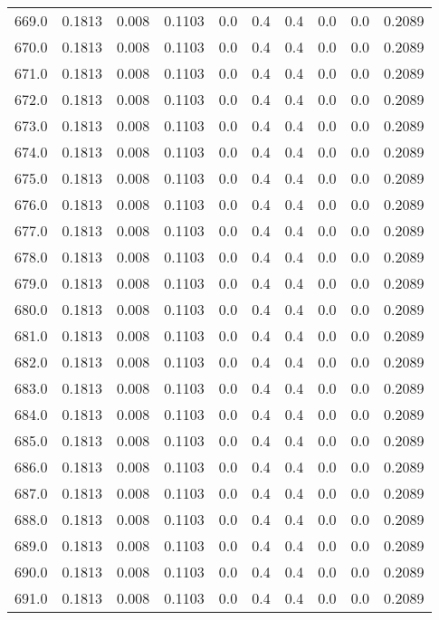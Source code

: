 \begin{longtable}{lrrrrrrrrr}
669.0 & 0.1813 & 0.008 & 0.1103 & 0.0 & 0.4 & 0.4 & 0.0 & 0.0 & 0.2089 \\
670.0 & 0.1813 & 0.008 & 0.1103 & 0.0 & 0.4 & 0.4 & 0.0 & 0.0 & 0.2089 \\
671.0 & 0.1813 & 0.008 & 0.1103 & 0.0 & 0.4 & 0.4 & 0.0 & 0.0 & 0.2089 \\
672.0 & 0.1813 & 0.008 & 0.1103 & 0.0 & 0.4 & 0.4 & 0.0 & 0.0 & 0.2089 \\
673.0 & 0.1813 & 0.008 & 0.1103 & 0.0 & 0.4 & 0.4 & 0.0 & 0.0 & 0.2089 \\
674.0 & 0.1813 & 0.008 & 0.1103 & 0.0 & 0.4 & 0.4 & 0.0 & 0.0 & 0.2089 \\
675.0 & 0.1813 & 0.008 & 0.1103 & 0.0 & 0.4 & 0.4 & 0.0 & 0.0 & 0.2089 \\
676.0 & 0.1813 & 0.008 & 0.1103 & 0.0 & 0.4 & 0.4 & 0.0 & 0.0 & 0.2089 \\
677.0 & 0.1813 & 0.008 & 0.1103 & 0.0 & 0.4 & 0.4 & 0.0 & 0.0 & 0.2089 \\
678.0 & 0.1813 & 0.008 & 0.1103 & 0.0 & 0.4 & 0.4 & 0.0 & 0.0 & 0.2089 \\
679.0 & 0.1813 & 0.008 & 0.1103 & 0.0 & 0.4 & 0.4 & 0.0 & 0.0 & 0.2089 \\
680.0 & 0.1813 & 0.008 & 0.1103 & 0.0 & 0.4 & 0.4 & 0.0 & 0.0 & 0.2089 \\
681.0 & 0.1813 & 0.008 & 0.1103 & 0.0 & 0.4 & 0.4 & 0.0 & 0.0 & 0.2089 \\
682.0 & 0.1813 & 0.008 & 0.1103 & 0.0 & 0.4 & 0.4 & 0.0 & 0.0 & 0.2089 \\
683.0 & 0.1813 & 0.008 & 0.1103 & 0.0 & 0.4 & 0.4 & 0.0 & 0.0 & 0.2089 \\
684.0 & 0.1813 & 0.008 & 0.1103 & 0.0 & 0.4 & 0.4 & 0.0 & 0.0 & 0.2089 \\
685.0 & 0.1813 & 0.008 & 0.1103 & 0.0 & 0.4 & 0.4 & 0.0 & 0.0 & 0.2089 \\
686.0 & 0.1813 & 0.008 & 0.1103 & 0.0 & 0.4 & 0.4 & 0.0 & 0.0 & 0.2089 \\
687.0 & 0.1813 & 0.008 & 0.1103 & 0.0 & 0.4 & 0.4 & 0.0 & 0.0 & 0.2089 \\
688.0 & 0.1813 & 0.008 & 0.1103 & 0.0 & 0.4 & 0.4 & 0.0 & 0.0 & 0.2089 \\
689.0 & 0.1813 & 0.008 & 0.1103 & 0.0 & 0.4 & 0.4 & 0.0 & 0.0 & 0.2089 \\
690.0 & 0.1813 & 0.008 & 0.1103 & 0.0 & 0.4 & 0.4 & 0.0 & 0.0 & 0.2089 \\
691.0 & 0.1813 & 0.008 & 0.1103 & 0.0 & 0.4 & 0.4 & 0.0 & 0.0 & 0.2089 \\

\end{longtable}
